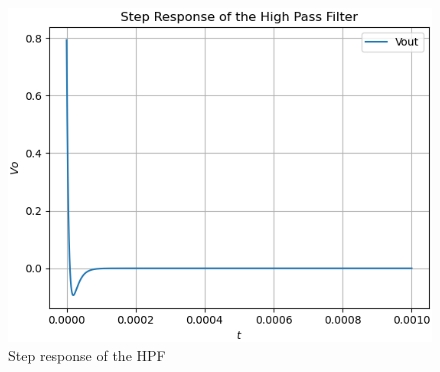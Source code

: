 \documentclass[11pt, a4paper]{article}
\begin{document}
    \begin{figure}[!h]
        \centering
        \includegraphics[scale = 0.65]{Figure 4.png}
        \caption{Step response of the HPF}
        \label{fig:Figure 4}
    \end{figure}
\end{document}
